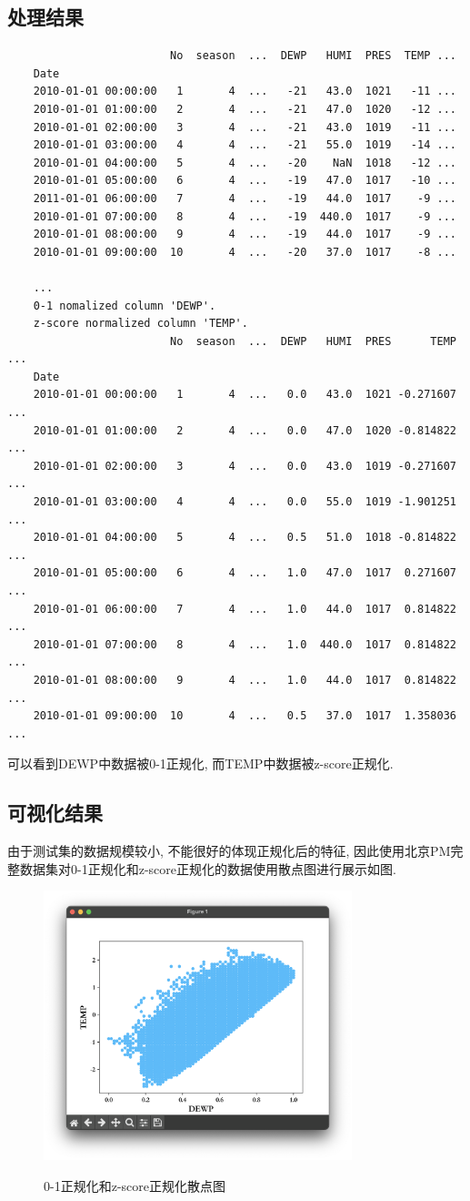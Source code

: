 \subsection{处理结果}
\begin{lstlisting}
                         No  season  ...  DEWP   HUMI  PRES  TEMP ...
    Date
    2010-01-01 00:00:00   1       4  ...   -21   43.0  1021   -11 ...
    2010-01-01 01:00:00   2       4  ...   -21   47.0  1020   -12 ...
    2010-01-01 02:00:00   3       4  ...   -21   43.0  1019   -11 ...
    2010-01-01 03:00:00   4       4  ...   -21   55.0  1019   -14 ...
    2010-01-01 04:00:00   5       4  ...   -20    NaN  1018   -12 ...
    2010-01-01 05:00:00   6       4  ...   -19   47.0  1017   -10 ...
    2011-01-01 06:00:00   7       4  ...   -19   44.0  1017    -9 ...
    2010-01-01 07:00:00   8       4  ...   -19  440.0  1017    -9 ...
    2010-01-01 08:00:00   9       4  ...   -19   44.0  1017    -9 ...
    2010-01-01 09:00:00  10       4  ...   -20   37.0  1017    -8 ...

    ...
    0-1 nomalized column 'DEWP'.
    z-score normalized column 'TEMP'.
                         No  season  ...  DEWP   HUMI  PRES      TEMP ...
    Date
    2010-01-01 00:00:00   1       4  ...   0.0   43.0  1021 -0.271607 ...
    2010-01-01 01:00:00   2       4  ...   0.0   47.0  1020 -0.814822 ...
    2010-01-01 02:00:00   3       4  ...   0.0   43.0  1019 -0.271607 ...
    2010-01-01 03:00:00   4       4  ...   0.0   55.0  1019 -1.901251 ...
    2010-01-01 04:00:00   5       4  ...   0.5   51.0  1018 -0.814822 ...
    2010-01-01 05:00:00   6       4  ...   1.0   47.0  1017  0.271607 ...
    2010-01-01 06:00:00   7       4  ...   1.0   44.0  1017  0.814822 ...
    2010-01-01 07:00:00   8       4  ...   1.0  440.0  1017  0.814822 ...
    2010-01-01 08:00:00   9       4  ...   1.0   44.0  1017  0.814822 ...
    2010-01-01 09:00:00  10       4  ...   0.5   37.0  1017  1.358036 ...
\end{lstlisting}
可以看到DEWP中数据被0-1正规化, 而TEMP中数据被z-score正规化.

\subsection{可视化结果}
由于测试集的数据规模较小, 不能很好的体现正规化后的特征,
因此使用北京PM完整数据集对0-1正规化和z-score正规化的数据使用散点图进行展示如图.
\begin{figure}
    \centering
    \includegraphics[width=0.8\textwidth]{figures/normalized-scatter.png}
    \label{fig:0-1正规化和z-score正规化散点图}
    \caption{0-1正规化和z-score正规化散点图}
\end{figure}